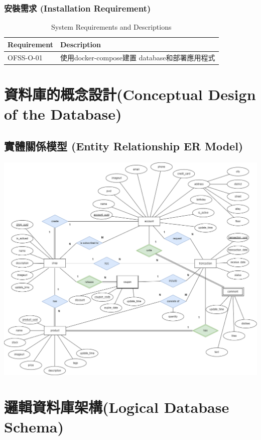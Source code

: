 \documentclass[a4paper, 12pt]{article}
\begin{document}
\subsubsection{安裝需求 (Installation Requirement)}
\begin{table}[h]
    \centering
    \renewcommand{\arraystretch}{1.35}
    \begin{tabular}{|p{3cm}|p{10cm}|}
        \hline
        \textbf{Requirement} & \textbf{Description} \\
        \hline
        OFSS-O-01 & 使用docker-compose建置 database和部署應用程式 \\
        \hline
    \end{tabular}
    \caption{System Requirements and Descriptions}
    \label{tab:system-requirements}
\end{table}

\newpage
\section{資料庫的概念設計(Conceptual Design of the Database)}
\subsection{實體關係模型 (Entity Relationship ER Model)}
\includegraphics[scale=0.35]{image/er_diagram.png}
\newpage
\section{邏輯資料庫架構(Logical Database Schema)}
\end{document}
